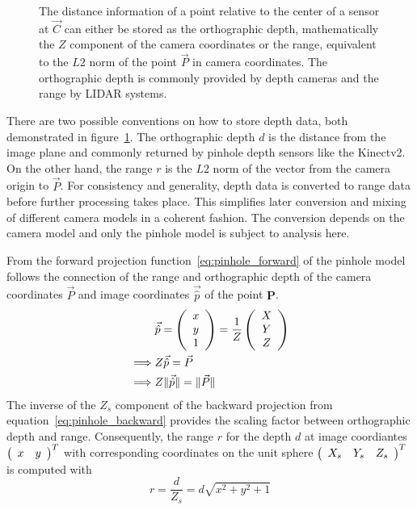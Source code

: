 \begin{figure}[H]
    \scalebox{0.8}{%
    
    }
    \caption[Orthographic Depth and Range visualized]{The distance information of a point relative to the center of a sensor at $\vec{C}$ can either be stored as the orthographic depth, mathematically the $Z$ component of the camera coordinates or the range, equivalent to the $L2$ norm of the point $\vec{P}$ in camera coordinates. The orthographic depth is commonly provided by depth cameras and the range by \acrshort{LIDAR} systems.}
    \label{fig:range_depth}
\end{figure}

There are two possible conventions on how to store depth data, both demonstrated in figure~\ref{fig:range_depth}.
The orthographic depth $d$ is the distance from the image plane and commonly returned by pinhole depth sensors like the Kinectv2.
On the other hand, the range $r$ is the $L2$ norm of the vector from the camera origin to $\vec{P}$.
For consistency and generality, depth data is converted to range data before further processing takes place.
This simplifies later conversion and mixing of different camera models in a coherent fashion.
The conversion depends on the camera model and only the pinhole model is subject to analysis here.

From the forward projection function~\ref{eq:pinhole_forward} of the pinhole model follows the connection of the range and orthographic depth of the camera coordinates $\vec{P}$ and image coordinates $\vec{\hat{p}}$ of the point $\mathbf{P}$.
\begin{equation}
\begin{aligned}
    &\vec{\hat{p}} = \left(\begin{array}{c} x \\ y \\ 1 \end{array}\right) = \frac{1}{Z}\left(\begin{array}{c} X \\ Y \\ Z \end{array}\right) \\
    \implies &Z \vec{\hat{p}} = \vec{P} \\
    \implies &Z \lVert\vec{\hat{p}}\rVert = \lVert\vec{P}\rVert
\end{aligned}
\end{equation}
The inverse of the $Z_{s}$ component of the backward projection from equation~\ref{eq:pinhole_backward} provides the scaling factor between orthographic depth and range.
Consequently, the range $r$ for the depth $d$ at image coordiantes $\left(\begin{array}{cc} x & y \end{array}\right)^T$ with corresponding coordinates on the unit sphere $\left(\begin{array}{ccc} X_s & Y_s & Z_s \end{array}\right)^T$ is computed with
\begin{equation}
    r = \frac{d}{Z_s} = d \sqrt{x^2 + y^2 + 1}
\end{equation}
